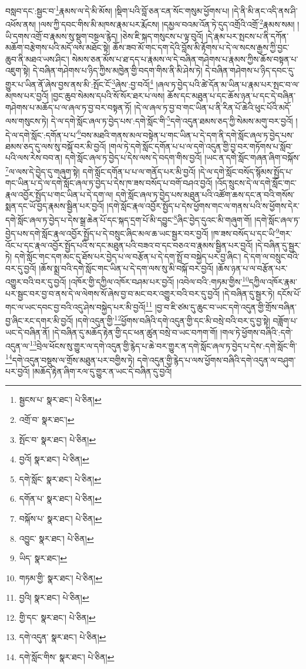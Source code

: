 བསླབ་དང་:སྦྱང་བ་\footnote{སྦྱངས་པ་  སྣར་ཐང་།  པེ་ཅིན། }རྣམས་ལ་དེ་མི་མོས། །སྡིག་པའི་བློ་ཅན་ངན་སོང་གསུམ་ཕྱོགས་པ། །དེ་ནི་མི་ནང་འདི་ནས་ཤི་འཕོས་ནས། །ལས་ཀྱི་དབང་གིས་མི་མཁས་རྣམ་པར་རྨོངས། །དམྱལ་བའམ་འོན་ཏེ་དུད་འགྲོའི་འགྲོ་\footnote{འགྲོ་བ་  སྣར་ཐང་། }རྣམས་སམ། །ཡི་དགས་འགྲོ་བ་རྣམས་སུ་སྡུག་བསྔལ་རྙེད། །ཅེས་ཇི་སྐད་གསུངས་པ་ལྟ་བུའོ། །དེ་རྣམ་པར་སྤངས་པ་ནི་དཀོན་མཆོག་བརྩེགས་པའི་མདོ་ལས་མཐོང་སྟེ། ཆོས་ཟབ་མོ་གང་དག་དེའི་བློས་མི་རྟོགས་པ་དེ་ལ་སངས་རྒྱས་ཀྱི་བྱང་ཆུབ་ནི་མཐའ་ཡས་ཤིང་། སེམས་ཅན་མོས་པ་ཐ་དད་པ་རྣམས་ལ་དེ་བཞིན་གཤེགས་པ་རྣམས་ཀྱིས་ཆོས་བསྟན་པ་འཇུག་སྟེ། དེ་བཞིན་གཤེགས་པ་ཉིད་ཀྱིས་མཁྱེན་གྱི་བདག་གིས་ནི་མི་ཤེས་ཏེ། དེ་བཞིན་གཤེགས་པ་ཉིད་དབང་དུ་གྱུར་པ་ཡིན་ནོ་ཞེས་བྱས་ནས་མི་:སྤོང་ངོ་\footnote{སྤོང་བ་  སྣར་ཐང་།  པེ་ཅིན། }ཞེས་:བྱ་བའོ།\footnote{བྱའོ།  སྣར་ཐང་།  པེ་ཅིན། } །ཞལ་ཏ་བྱེད་པའི་ཚེ་དོན་མ་ཡིན་པ་རྣམ་པར་སྤང་བ་ལ་མཁས་པར་བྱའོ། །བྱང་ཆུབ་སེམས་དཔའི་སོ་སོར་ཐར་པ་ལས། ཆོས་དང་མཐུན་པ་དང་ཆོས་ཉན་པ་དང་དེ་བཞིན་གཤེགས་པ་མཆོད་པ་ལ་ཞལ་ཏ་བྱ་བར་བསྟན་ཏོ། །དེ་ལ་ཞལ་ཏ་བྱ་བ་གང་ཡིན་པ་ནི་རིན་པོ་ཆེའི་ཕུང་པོའི་མདོ་ལས་གསུངས་ཏེ། དེ་ལ་དགེ་སློང་ཞལ་ཏ་བྱེད་པས་:དགེ་སློང་གི་\footnote{དགེ་སློང་  སྣར་ཐང་།  པེ་ཅིན། }དགེ་འདུན་ཐམས་ཅད་ཀྱི་སེམས་མགུ་བར་བྱའོ། །དེ་ལ་དགེ་སློང་:དགོན་པ་པ་\footnote{དགོན་པ་  སྣར་ཐང་།  པེ་ཅིན། }བས་མཐའི་གནས་མལ་བསྟེན་པ་གང་ཡིན་པ་དེ་དག་ནི་དགེ་སློང་ཞལ་ཏ་བྱེད་པས་ཐམས་ཅད་དུ་ལས་སུ་བསྐོ་བར་མི་བྱའོ། །གལ་ཏེ་དགེ་སློང་དགོན་པ་པ་ལ་དགེ་འདུན་གྱི་བྱ་བར་གཏོགས་པ་སློབ་པའི་ལས་རེས་བབ་ན། དགེ་སློང་ཞལ་ཏ་བྱེད་པ་དེས་ལས་དེ་བདག་གིས་བྱའོ། །ཡང་ན་དགེ་སློང་གཞན་ཞིག་བསྐོས་\footnote{བསྐོས་པ་  སྣར་ཐང་།  པེ་ཅིན། }ལ་ལས་དེ་བྱེད་དུ་གཞུག་སྟེ། དགེ་སློང་དགོན་པ་པ་ལ་གནོད་པར་མི་བྱའོ། །དེ་ལ་དགེ་སློང་བསོད་སྙོམས་སྤྱོད་པ་གང་ཡིན་པ་དེ་ལ་དགེ་སློང་ཞལ་ཏ་བྱེད་པ་དེས་ཁ་ཟས་བསོད་པ་བགོ་བཤའ་བྱའོ། །འོད་སྲུངས་དེ་ལ་དགེ་སློང་གང་རྣལ་འབྱོར་སྤྱོད་པ་གང་ཡིན་པ་དེ་དག་ལ། དགེ་སློང་ཞལ་ཏ་བྱེད་པས་མཐུན་པའི་འཚོག་ཆས་དང་ན་བའི་གསོས་སྨན་དང་ཡོ་བྱད་རྣམས་སྦྱིན་པར་བྱའོ། །དགེ་སློང་རྣལ་འབྱོར་སྤྱོད་པ་དེས་ཕྱོགས་གང་ལ་གནས་པའི་ས་ཕྱོགས་དེར་དགེ་སློང་ཞལ་ཏ་བྱེད་པ་དེས་སྒྲ་ཆེན་པོ་དང་སྐད་དྲག་པོ་མི་དབྱུང་\footnote{འབྱུང་  སྣར་ཐང་།  པེ་ཅིན། }ཞིང་བྱེད་དུའང་མི་གཞུག་གོ། །དགེ་སློང་ཞལ་ཏ་བྱེད་པས་དགེ་སློང་རྣལ་འབྱོར་སྤྱོད་པ་དེ་བསྲུང་ཞིང་མལ་ཆ་ཡང་སྦྱར་བར་བྱའོ། །ཁ་ཟས་བསོད་པ་དང་ཡི་\footnote{ཡིད་  སྣར་ཐང་། }གར་འོང་པ་དང་རྣལ་འབྱོར་སྤྱོད་པའི་ས་དང་མཐུན་པའི་བཟའ་བ་དང་བཅའ་བ་རྣམས་སྦྱིན་པར་བྱའོ། །དེ་བཞིན་དུ་སྦྱར་ཏེ། དགེ་སློང་གང་དག་མང་དུ་ཐོས་པར་བྱེད་པ་ལ་བརྩོན་པ་དེ་དག་སྤྲོ་བ་བསྐྱེད་པར་བྱ་ཞིང་། དེ་དག་ལ་བསྲུང་བའི་བར་དུ་བྱའོ། །ཆོས་སྨྲ་བའི་དགེ་སློང་གང་ཡིན་པ་དེ་དག་ལས་སུ་མི་བསྐོ་བར་བྱའོ། །ཆོས་ཉན་པ་ལ་བརྩོན་པར་འགྱུར་བའི་བར་དུ་བྱའོ། །འཁོར་གྱི་དཀྱིལ་འཁོར་བཤམ་པར་བྱའོ། །འབེལ་བའི་:གཏམ་གྱིས་\footnote{གཏམ་གྱི་  སྣར་ཐང་།  པེ་ཅིན། }དཀྱིལ་འཁོར་རྣམ་པར་སྦྱང་བར་བྱ་བ་ནས་དེ་ལ་ལེགས་སོ་ཞེས་བྱ་བ་མང་བར་འགྱུར་བའི་བར་དུ་བྱའོ། །དེ་བཞིན་དུ་སྦྱར་ཏེ། དངོས་པོ་གང་ལ་ཡང་དབང་བྱ་བའི་འདུ་ཤེས་བསྐྱེད་པར་མི་བྱའོ།\footnote{བྱའི།  སྣར་ཐང་།  པེ་ཅིན། } །བྱ་བ་ཇི་ཙམ་དུ་ཆུང་བ་ཡང་དགེ་འདུན་གྱི་གྲོས་བཞིན་བྱ་ཞིང་རང་དགར་མི་བྱའོ། །དགེ་འདུན་གྱི་\footnote{གྱི་དང་  སྣར་ཐང་།  པེ་ཅིན། }ཕྱོགས་བཞིའི་དགེ་འདུན་གྱི་དང་མི་བསྲེ་བའི་བར་དུ་བྱ་སྟེ། བཟློག་པ་ཡང་དེ་བཞིན་ནོ། །དེ་བཞིན་དུ་མཆོད་རྟེན་གྱི་དང་ཕན་ཚུན་བསྲེ་བ་ཡང་བཀག་གོ། །གལ་ཏེ་ཕྱོགས་བཞིའི་:དགེ་འདུན་ལ་\footnote{དགེ་འདུན་  སྣར་ཐང་།  པེ་ཅིན། }བྲེལ་ཕོངས་སུ་གྱུར་ལ་དགེ་འདུན་གྱི་རྙེད་པ་ཆེ་བར་གྱུར་ན་དགེ་སློང་ཞལ་ཏ་བྱེད་པ་དེས་:དགེ་སློང་གི་\footnote{དགེ་སློང་གིས་  སྣར་ཐང་།  པེ་ཅིན། }དགེ་འདུན་བསྡུས་ལ་གྲོས་མཐུན་པར་བགྱིས་ཏེ། དགེ་འདུན་གྱི་རྙེད་པ་ལས་ཕྱོགས་བཞིའི་དགེ་འདུན་ལ་བཤུག་པར་བྱའོ། །མཆོད་རྟེན་ཞིག་རལ་དུ་གྱུར་ན་ཡང་དེ་བཞིན་དུ་བྱའོ། 